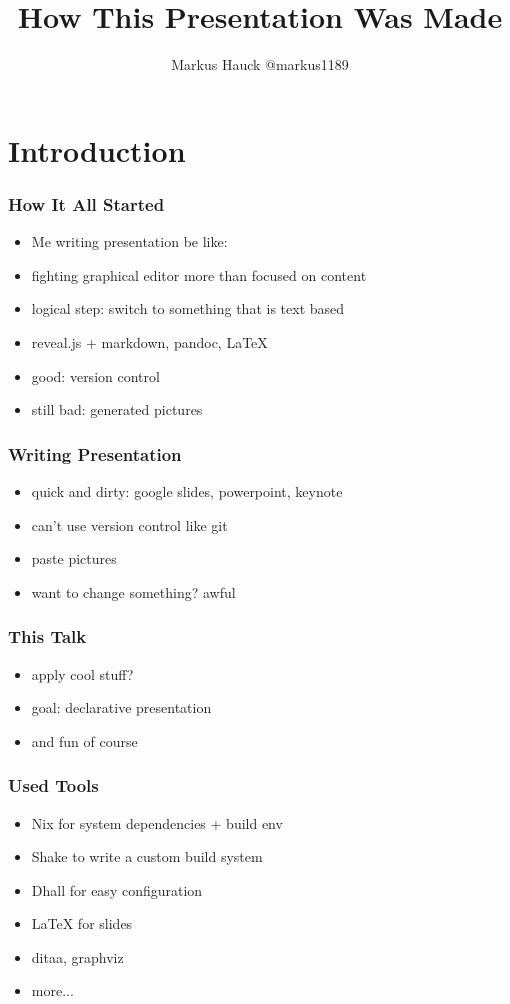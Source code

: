 \documentclass{beamer}
\title{How This Presentation Was Made}
\author{Markus Hauck @markus1189}
\begin{document}
\begin{frame}
  \titlepage{}
\end{frame}

\section{Introduction}\label{sec:introduction}

\begin{frame}
  \frametitle{How It All Started}
  \begin{itemize}
  \item Me writing presentation be like:
  \item fighting graphical editor more than focused on content
  \item logical step: switch to something that is text based
  \item reveal.js + markdown, pandoc, LaTeX
  \item good: version control
  \item still bad: generated pictures
  \end{itemize}
\end{frame}

\begin{frame}
  \frametitle{Writing Presentation}
  \begin{itemize}
  \item quick and dirty: google slides, powerpoint, keynote
  \item can't use version control like git
  \item paste pictures
  \item want to change something? awful
  \end{itemize}
\end{frame}

\begin{frame}
  \frametitle{This Talk}
  \begin{itemize}
  \item apply cool stuff?
  \item goal: declarative presentation
  \item and fun of course
  \end{itemize}
\end{frame}

\begin{frame}
  \frametitle{Used Tools}
  \begin{itemize}
  \item Nix for system dependencies + build env
  \item Shake to write a custom build system
  \item Dhall for easy configuration
  \item LaTeX for slides
  \item ditaa, graphviz
  \item more...
  \end{itemize}
\end{frame}
\end{document}
